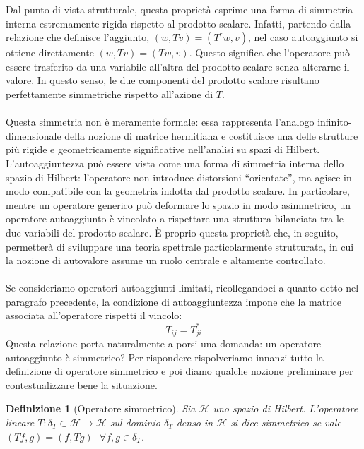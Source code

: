 \documentclass[a4paper,12pt]{report}
\newtheorem{definizione}{Definizione}[chapter]
\begin{document}
Dal punto di vista strutturale, questa proprietà esprime una forma di simmetria interna estremamente rigida rispetto al prodotto scalare. Infatti, partendo dalla relazione che definisce l’aggiunto, $(w, Tv) = (T^\dagger w, v)$, nel caso autoaggiunto si ottiene direttamente $(w, Tv) = (Tw, v)$.
Questo significa che l’operatore può essere trasferito da una variabile all’altra del prodotto scalare senza alterarne il valore. In questo senso, le due componenti del prodotto scalare risultano perfettamente simmetriche rispetto all’azione di \(T\).
\\
\\Questa simmetria non è meramente formale: essa rappresenta l’analogo infinito-dimensionale della nozione di matrice hermitiana e costituisce una delle strutture più rigide e geometricamente significative nell’analisi su spazi di Hilbert.
L’autoaggiuntezza può essere vista come una forma di simmetria interna dello spazio di Hilbert: l’operatore non introduce distorsioni “orientate”, ma agisce in modo compatibile con la geometria indotta dal prodotto scalare. In particolare, mentre un operatore generico può deformare lo spazio in modo asimmetrico, un operatore autoaggiunto è vincolato a rispettare una struttura bilanciata tra le due variabili del prodotto scalare. È proprio questa proprietà che, in seguito, permetterà di sviluppare una teoria spettrale particolarmente strutturata, in cui la nozione di autovalore assume un ruolo centrale e altamente controllato.
\\
\\ Se consideriamo operatori autoaggiunti limitati, ricollegandoci a quanto detto nel paragrafo precedente, la condizione di autoaggiuntezza impone che la matrice associata all'operatore rispetti il vincolo:
\[T_{ij}=T_{ji}^*
\]
Questa relazione porta naturalmente a porsi una domanda: un operatore autoaggiunto è simmetrico? Per rispondere rispolveriamo innanzi tutto la definizione di operatore simmetrico e poi diamo  qualche nozione preliminare per contestualizzare bene la situazione.

\begin{definizione}[Operatore simmetrico]
    Sia $\mathscr{H}$ uno spazio di Hilbert. L'operatore lineare $T: \delta_T\subset\mathscr{H}\to\mathscr{H}$ sul dominio $\delta_T$ denso in $\mathscr{H}$ si dice simmetrico se vale $(Tf,g)=(f,Tg)\ \ \ \forall f,g\in \delta_T $.
\end{definizione}
\end{document}
